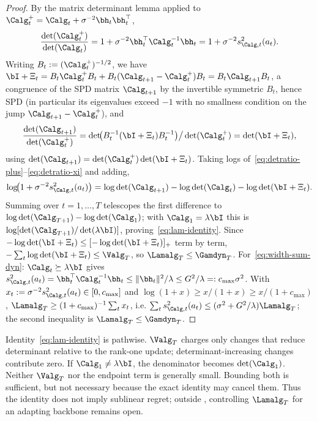 \begin{proof}
By the matrix determinant lemma applied to
$\Calg_t^{+}=\Calg_t+\sigma^{-2}\bh_t\bh_t^\top$,
\begin{equation}\label{eq:detratio-plus}
  \frac{\det(\Calg_t^{+})}{\det(\Calg_t)}
  = 1+\sigma^{-2}\bh_t^\top\Calg_t^{-1}\bh_t
  = 1+\sigma^{-2}s_{\Calg,t}^2(a_t).
\end{equation}
Writing $B_t:=(\Calg_t^{+})^{-1/2}$, we have
$\bI+\Xi_t=B_t\Calg_t^{+}B_t+B_t(\Calg_{t+1}-\Calg_t^{+})B_t
=B_t\Calg_{t+1}B_t$, a congruence of the SPD matrix $\Calg_{t+1}$ by the
invertible symmetric $B_t$, hence SPD (in particular its eigenvalues exceed
$-1$ with no smallness condition on the jump $\Calg_{t+1}-\Calg_t^{+}$), and
\begin{equation}\label{eq:detratio-xi}
  \frac{\det(\Calg_{t+1})}{\det(\Calg_t^{+})}
  = \det\!\bigl(B_t^{-1}(\bI+\Xi_t)B_t^{-1}\bigr)\big/\det(\Calg_t^{+})
  = \det(\bI+\Xi_t),
\end{equation}
using $\det(\Calg_{t+1})=\det(\Calg_t^{+})\det(\bI+\Xi_t)$.
Taking logs of~\eqref{eq:detratio-plus}--\eqref{eq:detratio-xi} and adding,
\[
  \log\!\bigl(1+\sigma^{-2}s_{\Calg,t}^2(a_t)\bigr)
  = \log\det(\Calg_{t+1}) - \log\det(\Calg_t) - \log\det(\bI+\Xi_t).
\]
Summing over $t=1,\dots,T$ telescopes the first difference to
$\log\det(\Calg_{T+1})-\log\det(\Calg_1)$; with $\Calg_1=\lambda\bI$ this is
$\log[\det(\Calg_{T+1})/\det(\lambda\bI)]$, proving~\eqref{eq:lam-identity}.
Since $-\log\det(\bI+\Xi_t)\le[-\log\det(\bI+\Xi_t)]_+$ term by term,
$-\sum_t\log\det(\bI+\Xi_t)\le\Valg_T$, so $\Lamalg_T\le\Gamdyn_T$.
For~\eqref{eq:width-sum-dyn}: $\Calg_t\succeq\lambda\bI$ gives
$s_{\Calg,t}^2(a_t)=\bh_t^\top\Calg_t^{-1}\bh_t\le\|\bh_t\|^2/\lambda\le
G^2/\lambda=:c_{\max}\sigma^2$.  With $x_t:=\sigma^{-2}s_{\Calg,t}^2(a_t)\in
[0,c_{\max}]$ and $\log(1+x)\ge x/(1+x)\ge x/(1+c_{\max})$,
$\Lamalg_T\ge(1+c_{\max})^{-1}\sum_t x_t$, i.e.
$\sum_t s_{\Calg,t}^2(a_t)\le(\sigma^2+G^2/\lambda)\Lamalg_T$; the second
inequality is $\Lamalg_T\le\Gamdyn_T$.
\end{proof}

\begin{remark}
Identity~\eqref{eq:lam-identity} is pathwise.  $\Valg_T$ charges only changes
that reduce determinant relative to the rank-one update; determinant-increasing
changes contribute zero.  If $\Calg_1\ne\lambda\bI$, the denominator becomes
$\det(\Calg_1)$.  Neither $\Valg_T$ nor the endpoint term is generally small.
Bounding both is sufficient, but not necessary because the exact identity may
cancel them.  Thus the identity does not imply sublinear regret; outside
, controlling $\Lamalg_T$ for an
adapting backbone remains open.
\end{remark}

